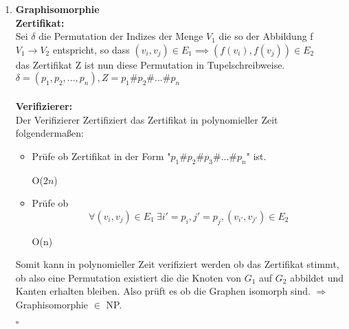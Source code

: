 \documentclass{article}
\begin{document}
\begin{enumerate}[label=(\alph*).]
		\item \textbf{Graphisomorphie}\\
		\textbf{Zertifikat:}\\
		Sei $\delta$ die Permutation der Indizes der Menge $V_1$ die so der Abbildung f $V_1 \rightarrow V_2$ entspricht, so dass $(v_i,v_j) \in E_1 \implies (f(v_i),f(v_j)) \in E_2$\\
		das Zertifikat Z ist nun diese Permutation in Tupelschreibweise. \\
		$\delta = (p_1,p_2,...,p_n), Z = p_1\#p_2\#...\#p_n$\\\\
		\textbf{Verifizierer:}\\
		Der Verifizierer Zertifiziert das Zertifikat in polynomieller Zeit folgendermaßen:
		\begin{itemize}
			\item Prüfe ob Zertifikat in der Form "$p_1\#p_2\#p_3\#...\#p_n$" ist. \begin{flushright}O($2n$)\end{flushright}
			\item Prüfe ob $$
			\forall (v_i,v_j) \in E_1\ \exists i' = p_i, j' = p_j, (v_{i'},v_{j'}) \in E_2
			$$
			\begin{flushright}O(n)\end{flushright}
		\end{itemize}
		Somit kann in polynomieller Zeit verifiziert werden ob das Zertifikat stimmt, ob also eine Permutation existiert die die Knoten von $G_1$ auf $G_2$ abbildet und Kanten erhalten bleiben. Also prüft es ob die Graphen isomorph sind. $\Rightarrow$ Graphisomorphie $\in$ NP.
		\begin{flushright}$\square$\end{flushright}
	\end{enumerate}
\end{document}
